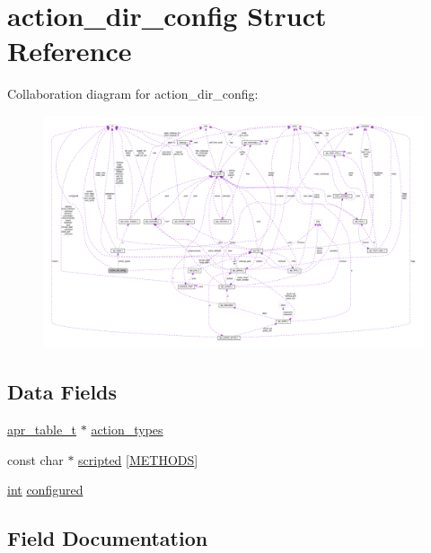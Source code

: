 \hypertarget{structaction__dir__config}{}\section{action\+\_\+dir\+\_\+config Struct Reference}
\label{structaction__dir__config}


Collaboration diagram for action\+\_\+dir\+\_\+config\+:
\nopagebreak
\begin{figure}[H]
\begin{center}
\leavevmode
\includegraphics[width=350pt]{structaction__dir__config__coll__graph}
\end{center}
\end{figure}
\subsection*{Data Fields}
\begin{DoxyCompactItemize}
\item 
\hyperlink{structapr__table__t}{apr\+\_\+table\+\_\+t} $\ast$ \hyperlink{structaction__dir__config_abc7b17f60748482c1235a01fa921b776}{action\+\_\+types}
\item 
const char $\ast$ \hyperlink{structaction__dir__config_ad241cccf1c537c7cf21fab08f487323a}{scripted} \mbox{[}\hyperlink{group__Methods_ga450901c43a43e4dd81eba1e9e229d3a1}{M\+E\+T\+H\+O\+DS}\mbox{]}
\item 
\hyperlink{pcre_8txt_a42dfa4ff673c82d8efe7144098fbc198}{int} \hyperlink{structaction__dir__config_a34ca39ab394d5bfac0977359538717de}{configured}
\end{DoxyCompactItemize}


\subsection{Field Documentation}
